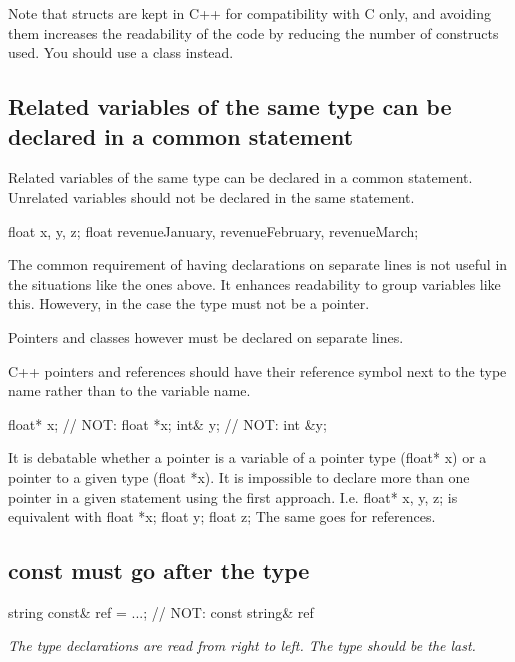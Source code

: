 \documentclass[a4paper,11pt,oneside]{scrbook}
\newcommand{\guideline}[1]{{\subsection{#1}}}
\newcommand{\motivation}[1]{{\normalfont \itshape #1}}
\newcommand{\trcode}[1]{{\normalfont \ttfamily #1}}
\begin{document}
Note that structs are kept in C++ for compatibility with C only, and
avoiding them increases the readability of the code by reducing the
number of constructs used. You should use a class instead.

\guideline{Related variables of the same type can be declared in a common statement}

Related variables of the same type can be declared in a common statement.
Unrelated variables should not be declared in the same statement. 

\begin{code}
  float x, y, z;
  float revenueJanuary, revenueFebruary, revenueMarch; 
\end{code}

The common requirement of having declarations on separate lines is not
useful in the situations like the ones above. It enhances readability
to group variables like this. Howevery, in the case the type must not be
a pointer.

Pointers and classes however must be declared on separate lines.

C++ pointers and references should have their reference symbol next to
the type name rather than to the variable name.

\begin{code}
  float* x;    // NOT: float *x;
  int&   y;    // NOT: int &y;
\end{code}

It is debatable whether a pointer is a variable of a pointer type
(float* x) or a pointer to a given type (float *x). It is impossible
to declare more than one pointer in a given statement using the first
approach. I.e. float* x, y, z; is equivalent with float *x; float y;
float z; The same goes for references.

\guideline{\trcode{const} must go after the type}

\begin{code}
  string const& ref = ...;      // NOT: const string& ref
\end{code}

\motivation{
  The type declarations are read from right to left. The type should be the last.
}
\end{document}
